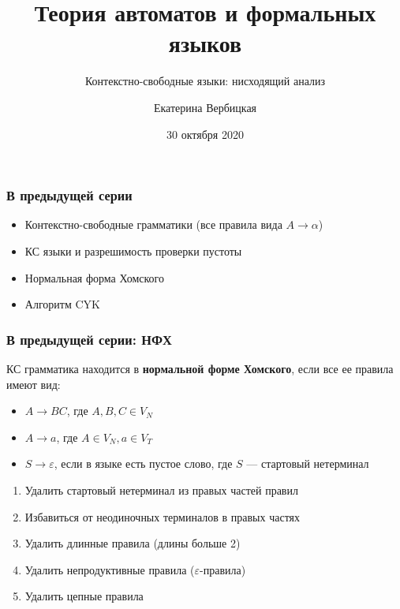 \documentclass{beamer}
\title[]{Теория автоматов и формальных языков}
\subtitle[]{Контекстно-свободные языки: нисходящий анализ}
\institute[]{
Санкт-Петербургский государственный электротехнический университет <<ЛЭТИ>>\\
}
\author[]{Екатерина Вербицкая}
\date{30 октября 2020}
\begin{document}
{
  \begin{frame}
    \titlepage
  \end{frame}
}


\begin{frame}[fragile]
  \transwipe[direction=90]
  \frametitle{В предыдущей серии}
  \begin{itemize}
    \item Контекстно-свободные грамматики (все правила вида $A \to \alpha$)
    \item КС языки и разрешимость проверки пустоты
    \item Нормальная форма Хомского
    \item Алгоритм CYK
  \end{itemize}
\end{frame}

\begin{frame}[fragile]
  \transwipe[direction=90]
  \frametitle{В предыдущей серии: НФХ}
  КС грамматика находится в \textbf{нормальной форме Хомского}, если все ее правила имеют вид:
  \begin{itemize}
    \item $A \to B C$, где $A,B,C \in V_N$
    \item $A \to a$, где $A \in V_N, a \in V_T$
    \item $S \to \varepsilon$, если в языке есть пустое слово, где $S$ --- стартовый нетерминал
  \end{itemize}

  \begin{enumerate}
    \item Удалить стартовый нетерминал из правых частей правил
    \item Избавиться от неодиночных терминалов в правых частях
    \item Удалить длинные правила (длины больше 2)
    \item Удалить непродуктивные правила ($\varepsilon$-правила)
    \item Удалить цепные правила
   \end{enumerate}
\end{frame}
\end{document}
